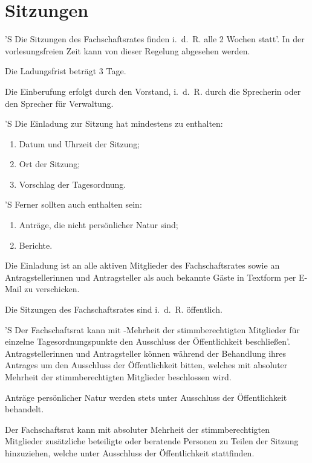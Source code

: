 \documentclass[%
	parskip=half,
]{scrartcl}
\newcounter{enumitem}
\begin{document}
\section{Sitzungen}

\begin{contract}

 \label{einberufung}

'S Die Sitzungen des Fachschaftsrates finden i.~d.~R. alle 2 Wochen statt'. In der vorlesungsfreien Zeit kann von 
dieser Regelung abgesehen werden.

Die Ladungsfrist beträgt 3 Tage.

Die Einberufung erfolgt durch den Vorstand, i.~d.~R. durch die Sprecherin oder den Sprecher für Verwaltung.

'S Die Einladung zur Sitzung hat mindestens zu enthalten:
\begin{enumerate}[\qquad a)]
	\item Datum und Uhrzeit der Sitzung;
	\item Ort der Sitzung;
	\item Vorschlag der Tagesordnung.
	\setcounter{enumitem}{\value{enumi}}
\end{enumerate}
'S Ferner sollten auch enthalten sein:
\begin{enumerate}[\qquad a)]
	\setcounter{enumi}{\value{enumitem}}
	\item Anträge, die nicht persönlicher Natur sind;
	\item Berichte.
\end{enumerate}

Die Einladung ist an alle aktiven Mitglieder des Fachschaftsrates sowie an Antragstellerinnen und Antragsteller als auch
bekannte Gäste in Textform per E-Mail zu verschicken.


Die Sitzungen des Fachschaftsrates sind i.~d.~R. öffentlich.

'S Der Fachschaftsrat kann mit -Mehrheit der stimmberechtigten Mitglieder für einzelne
Tagesordnungspunkte den Ausschluss der Öffentlichkeit beschließen'. Antragstellerinnen und Antragsteller können während
der Behandlung ihres Antrages um den Ausschluss der Öffentlichkeit bitten, welches mit absoluter Mehrheit der
stimmberechtigten Mitglieder beschlossen wird.

Anträge persönlicher Natur werden stets unter Ausschluss der Öffentlichkeit behandelt.

Der Fachschaftsrat kann mit absoluter Mehrheit der stimmberechtigten Mitglieder zusätzliche beteiligte oder beratende
Personen zu Teilen der Sitzung hinzuziehen, welche unter Ausschluss der Öffentlichkeit stattfinden.


\end{contract}
\end{document}
